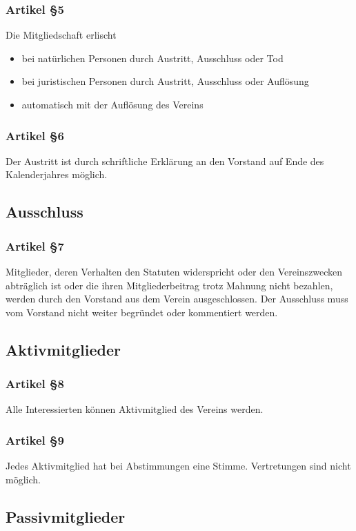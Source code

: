 \documentclass[a4paper,10pt,fleqn]{article}
\begin{document}
\subsubsection*{Artikel §5}
Die Mitgliedschaft erlischt
\begin{itemize}
\item bei natürlichen Personen durch Austritt, Ausschluss 
oder Tod
\item bei juristischen Personen durch Austritt, Ausschluss 
oder Auflösung
\item automatisch mit der Auflösung des Vereins
\end{itemize}

\subsubsection*{Artikel §6}
Der Austritt ist durch schriftliche Erklärung an den 
Vorstand auf Ende des Kalenderjahres möglich.

\subsection{Ausschluss}

\subsubsection*{Artikel §7}
Mitglieder, deren Verhalten den Statuten widerspricht oder
den Vereinszwecken abträglich ist oder die ihren
Mitgliederbeitrag trotz Mahnung nicht bezahlen, werden durch
den Vorstand aus dem Verein ausgeschlossen. Der Ausschluss
muss vom Vorstand nicht weiter begründet oder kommentiert
werden.

\subsection{Aktivmitglieder}

\subsubsection*{Artikel §8}
Alle Interessierten können Aktivmitglied des Vereins werden.

\subsubsection*{Artikel §9}
Jedes Aktivmitglied hat bei Abstimmungen eine Stimme. 
Vertretungen sind nicht möglich.

\subsection{Passivmitglieder}
\end{document}
